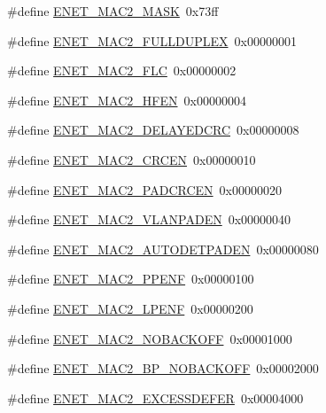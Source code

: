 \begin{DoxyCompactItemize}
\#define \hyperlink{group__ENET__17XX__40XX_ga090fe0a3c430ad527911dd8948323e56}{E\-N\-E\-T\-\_\-\-M\-A\-C2\-\_\-\-M\-A\-S\-K}~0x73ff
\item 
\#define \hyperlink{group__ENET__17XX__40XX_gada771902490e3391858094a565832f75}{E\-N\-E\-T\-\_\-\-M\-A\-C2\-\_\-\-F\-U\-L\-L\-D\-U\-P\-L\-E\-X}~0x00000001
\item 
\#define \hyperlink{group__ENET__17XX__40XX_ga572da08adf7e20dd2e9689c4a1bc6ee8}{E\-N\-E\-T\-\_\-\-M\-A\-C2\-\_\-\-F\-L\-C}~0x00000002
\item 
\#define \hyperlink{group__ENET__17XX__40XX_ga8937f821f7f1aa8aee29db2ade25085f}{E\-N\-E\-T\-\_\-\-M\-A\-C2\-\_\-\-H\-F\-E\-N}~0x00000004
\item 
\#define \hyperlink{group__ENET__17XX__40XX_ga87f7319213d7ad9c90e61ca1330ab531}{E\-N\-E\-T\-\_\-\-M\-A\-C2\-\_\-\-D\-E\-L\-A\-Y\-E\-D\-C\-R\-C}~0x00000008
\item 
\#define \hyperlink{group__ENET__17XX__40XX_gad21fa9aa92b57dff934b097738297a38}{E\-N\-E\-T\-\_\-\-M\-A\-C2\-\_\-\-C\-R\-C\-E\-N}~0x00000010
\item 
\#define \hyperlink{group__ENET__17XX__40XX_ga2e96a6046b10faf1b2e490ca0c44fe5e}{E\-N\-E\-T\-\_\-\-M\-A\-C2\-\_\-\-P\-A\-D\-C\-R\-C\-E\-N}~0x00000020
\item 
\#define \hyperlink{group__ENET__17XX__40XX_gaff48f524d6da4e540a30879dabebd6c4}{E\-N\-E\-T\-\_\-\-M\-A\-C2\-\_\-\-V\-L\-A\-N\-P\-A\-D\-E\-N}~0x00000040
\item 
\#define \hyperlink{group__ENET__17XX__40XX_ga7d73ffbca6a6db5a5262bb59e33627ed}{E\-N\-E\-T\-\_\-\-M\-A\-C2\-\_\-\-A\-U\-T\-O\-D\-E\-T\-P\-A\-D\-E\-N}~0x00000080
\item 
\#define \hyperlink{group__ENET__17XX__40XX_gabd9c8010102840735375d5b1bfd3ca73}{E\-N\-E\-T\-\_\-\-M\-A\-C2\-\_\-\-P\-P\-E\-N\-F}~0x00000100
\item 
\#define \hyperlink{group__ENET__17XX__40XX_gaa1c082cfc7d20fb9683a0a17c355fccf}{E\-N\-E\-T\-\_\-\-M\-A\-C2\-\_\-\-L\-P\-E\-N\-F}~0x00000200
\item 
\#define \hyperlink{group__ENET__17XX__40XX_ga914e8c639aaf94a0b451153485a2c1dc}{E\-N\-E\-T\-\_\-\-M\-A\-C2\-\_\-\-N\-O\-B\-A\-C\-K\-O\-F\-F}~0x00001000
\item 
\#define \hyperlink{group__ENET__17XX__40XX_ga43f27812a197029734f14e6d43671564}{E\-N\-E\-T\-\_\-\-M\-A\-C2\-\_\-\-B\-P\-\_\-\-N\-O\-B\-A\-C\-K\-O\-F\-F}~0x00002000
\item 
\#define \hyperlink{group__ENET__17XX__40XX_gaadf555a1169009b0dbb728dbc5046b14}{E\-N\-E\-T\-\_\-\-M\-A\-C2\-\_\-\-E\-X\-C\-E\-S\-S\-D\-E\-F\-E\-R}~0x00004000

\end{DoxyCompactItemize}
